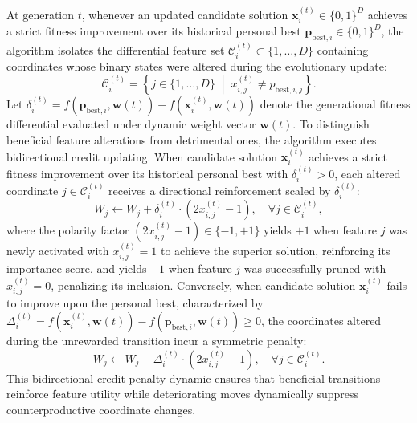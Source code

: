At generation $t$, whenever an updated candidate solution $\mathbf{x}_i^{(t)} \in \{0, 1\}^D$ achieves a strict fitness improvement over its historical personal best $\mathbf{p}_{\mathrm{best},i} \in \{0, 1\}^D$, the algorithm isolates the differential feature set $\mathcal{C}_i^{(t)} \subset \{1, \dots, D\}$ containing coordinates whose binary states were altered during the evolutionary update:
\begin{equation}
\mathcal{C}_i^{(t)} = \left\{j \in \{1, \dots, D\} \;\middle|\; x_{i,j}^{(t)} \neq p_{\mathrm{best},i,j}\right\}.
\label{eq:changed_features}
\end{equation}
Let $\delta_i^{(t)} = f(\mathbf{p}_{\mathrm{best},i}, \mathbf{w}(t)) - f(\mathbf{x}_i^{(t)}, \mathbf{w}(t))$ denote the generational fitness differential evaluated under dynamic weight vector $\mathbf{w}(t)$. To distinguish beneficial feature alterations from detrimental ones, the algorithm executes bidirectional credit updating. When candidate solution $\mathbf{x}_i^{(t)}$ achieves a strict fitness improvement over its historical personal best with $\delta_i^{(t)} > 0$, each altered coordinate $j \in \mathcal{C}_i^{(t)}$ receives a directional reinforcement scaled by $\delta_i^{(t)}$:
\begin{equation}
W_j \leftarrow W_j + \delta_i^{(t)} \cdot (2 x_{i,j}^{(t)} - 1), \quad \forall j \in \mathcal{C}_i^{(t)},
\label{eq:importance_update}
\end{equation}
where the polarity factor $(2 x_{i,j}^{(t)} - 1) \in \{-1, +1\}$ yields $+1$ when feature $j$ was newly activated with $x_{i,j}^{(t)} = 1$ to achieve the superior solution, reinforcing its importance score, and yields $-1$ when feature $j$ was successfully pruned with $x_{i,j}^{(t)} = 0$, penalizing its inclusion. Conversely, when candidate solution $\mathbf{x}_i^{(t)}$ fails to improve upon the personal best, characterized by $\Delta_i^{(t)} = f(\mathbf{x}_i^{(t)}, \mathbf{w}(t)) - f(\mathbf{p}_{\mathrm{best},i}, \mathbf{w}(t)) \ge 0$, the coordinates altered during the unrewarded transition incur a symmetric penalty:
\begin{equation}
W_j \leftarrow W_j - \Delta_i^{(t)} \cdot (2 x_{i,j}^{(t)} - 1), \quad \forall j \in \mathcal{C}_i^{(t)}.
\label{eq:importance_penalty}
\end{equation}
This bidirectional credit-penalty dynamic ensures that beneficial transitions reinforce feature utility while deteriorating moves dynamically suppress counterproductive coordinate changes.

